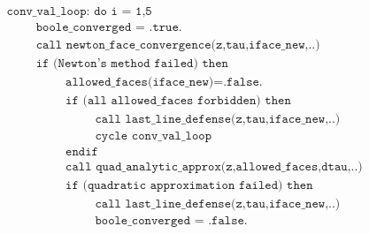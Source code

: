 \documentclass[./main.tex]{subfiles}
\begin{document}
\begin{align*}
&\texttt{conv\_val\_loop: do i = 1,5}\nonumber\\
&\hspace{1cm} \texttt{boole\_converged = .true.}\nonumber\\
&\hspace{1cm} \texttt{call newton\_face\_convergence(z,tau,iface\_new,..)}\nonumber\\
&\hspace{1cm} \texttt{if (Newton's method failed) then}\nonumber\\
&\hspace{2cm} \texttt{allowed\_faces(iface\_new)=.false.}\nonumber\\
&\hspace{2cm} \texttt{if (all allowed\_faces forbidden) then}\nonumber\\
&\hspace{3cm} \texttt{call last\_line\_defense(z,tau,iface\_new,..)}\nonumber\\
&\hspace{3cm} \texttt{cycle conv\_val\_loop}\nonumber\\
&\hspace{2cm} \texttt{endif}\nonumber\\
&\hspace{2cm} \texttt{call quad\_analytic\_approx(z,allowed\_faces,dtau,..)}\nonumber\\
&\hspace{2cm} \texttt{if (quadratic approximation failed) then}\nonumber\\
&\hspace{3cm} \texttt{call last\_line\_defense(z,tau,iface\_new,..)}\nonumber\\
&\hspace{3cm} \texttt{boole\_converged = .false.}\nonumber\\
\end{align*}
\end{document}
